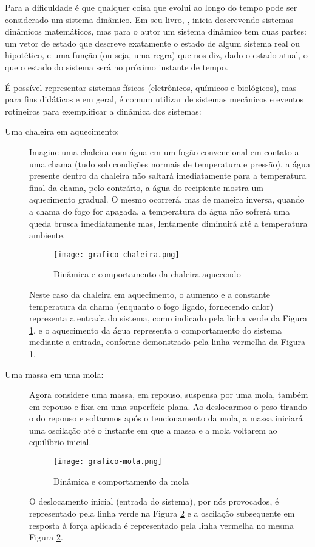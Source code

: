 Para  a dificuldade é que qualquer coisa que evolui ao longo do tempo pode ser considerado um sistema dinâmico. Em seu livro, , inicia descrevendo sistemas dinâmicos matemáticos, mas para o autor um sistema dinâmico tem duas partes: um vetor de estado que descreve exatamente o estado de algum sistema real ou hipotético, e uma função (ou seja, uma regra) que nos diz, dado o estado atual, o que o estado do sistema será no próximo instante de tempo.

É possível representar sistemas físicos (eletrônicos, químicos e biológicos), mas para fins didáticos e em geral, é comum utilizar de sistemas mecânicos e eventos rotineiros para exemplificar a dinâmica dos sistemas:

\begin{description}
	\item[Uma chaleira em aquecimento:] Imagine uma chaleira com água em um fogão convencional em contato a uma chama (tudo sob condições normais de temperatura e pressão), a água presente dentro da chaleira não saltará imediatamente para a temperatura final da chama, pelo contrário, a água do recipiente mostra um aquecimento gradual. O mesmo ocorrerá, mas de maneira inversa, quando a chama do fogo for apagada, a temperatura da água não sofrerá uma queda brusca imediatamente mas, lentamente diminuirá até a temperatura ambiente.
	
	\begin{figure}[htb]
		\centering
		\texttt{[image: grafico-chaleira.png]}
		\caption{Dinâmica e comportamento da chaleira aquecendo}
		\label{fig:chaleira}
	\end{figure}
	
	Neste caso da chaleira em aquecimento, o aumento e a constante temperatura da chama (enquanto o fogo ligado, fornecendo calor) representa a entrada do sistema, como indicado pela linha verde da Figura \ref{fig:chaleira}, e o aquecimento da água representa o comportamento do sistema mediante a entrada, conforme demonstrado pela linha vermelha da Figura \ref{fig:chaleira}. 
	
	\item[Uma massa em uma mola:] Agora considere uma massa, em repouso, suspensa por uma mola, também em repouso e fixa em uma superfície plana. Ao deslocarmos o peso tirando-o do repouso e soltarmos após o tencionamento da mola, a massa iniciará uma oscilação até o instante em que a massa e a mola voltarem ao equilíbrio inicial.	
	
	\begin{figure}[!htb]
		\centering
		\texttt{[image: grafico-mola.png]}
		\caption{Dinâmica e comportamento da mola}
		\label{fig:mola}		
	\end{figure}
	
	O deslocamento inicial (entrada do sistema), por nós provocados, é representado pela linha verde na Figura \ref{fig:mola} e a oscilação subsequente em resposta à força aplicada é representado pela linha vermelha no mesma Figura \ref{fig:mola}.
\end{description}

